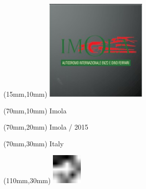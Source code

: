 \null\newpage
\begin{textblock*}{50mm}(15mm,10mm)%
\includegraphics[width=50mm]{LG/2015-05-20_00083.png}
\end{textblock*}
\begin{textblock*}{130mm}(70mm,10mm)%
{\fontsize{20}{20}\selectfont Imola}\\
\end{textblock*}
\begin{textblock*}{120mm}(70mm,20mm)%
{\fontsize{16}{16}\selectfont Imola / 2015}\\
\end{textblock*}
\begin{textblock*}{120mm}(70mm,30mm)%
{\fontsize{12}{12}\selectfont Italy}
\end{textblock*}
\begin{textblock*}{30mm}(110mm,30mm)%
\centering
\includegraphics[height=15mm]{icons/fa-rotate-left.pdf}
\end{textblock*}
